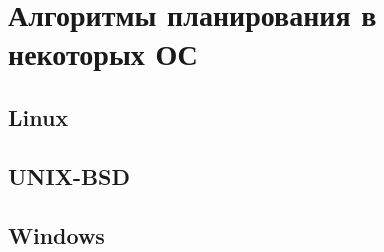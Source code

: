 \newpage
\section[Алгоритмы планирования в некоторых ОС]{Алгоритмы планирования в некоторых ОС}

\subsection{Linux}


\subsection{UNIX-BSD}


\subsection{Windows}
